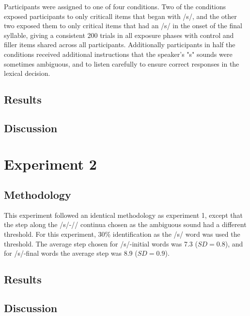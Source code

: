Participants were assigned to one of four conditions.  Two of the conditions exposed participants to only criticall items that began with /s/, and the other two exposed them to only critical items that had an /s/ in the onset of the final syllable, giving a consistent 200 trials in all exposure phases with control and filler items shared across all participants.  Additionally participants in half the conditions received additional instructions that the speaker's "s" sounds were sometimes ambiguous, and to listen carefully to ensure correct responses in the lexical decision.

\subsection{Results}

\subsection{Discussion}

\section{Experiment 2}

\subsection{Methodology}

This experiment followed an identical methodology as experiment 1, except that the step along the /s/-/\textesh/ continua chosen as the ambiguous sound had a different threshold.  For this experiment, 30\% identification as the /s/ word was used the threshold. The average step chosen for /s/-initial words was 7.3 ($SD = 0.8$), and for /s/-final words the average step was 8.9 ($SD = 0.9$).

\subsection{Results}

\subsection{Discussion}
